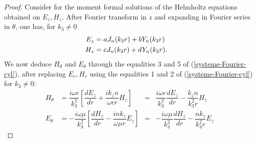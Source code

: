 \documentclass[12pt,%
    twoside,%
    a4paper,%
    openright, %
    ]{book}
\numberwithin{equation}{section} %
\renewcommand{\frac}[2]{\dfrac{#1}{#2}} %
\begin{document}
            \begin{proof}
                Consider for the moment formal solutions of the Helmholtz equations obtained on $E_z,H_z$.
                After Fourier transform in $z$ and expanding in Fourier series in $\theta$, one has, for $k_3\not=0$
                \begin{align*}
                    E_z&=aJ_n(k_3r)+bY_n(k_3r)\cr
                    H_z&=cJ_n(k_3r)+dY_n(k_3r).
                \end{align*}
                We now deduce $H_{\theta}$ and $E_{\theta}$ through the equalities 3 and 5 of (\ref{systeme-Fourier-cyl}), after replacing $E_r, H_r$ using the equalities 1 and 2 of (\ref{systeme-Fourier-cyl}) for $k_3\not=0$:
                \begin{align*}
                    H_{\theta}&=\frac{i\omega \epsilon}{k_3^2}[\frac{dE_z}{dr}+\frac{ik_zn}{\omega \epsilon r}H_z]&=& \frac{i\omega \epsilon}{k_3^2}\frac{dE_z}{dr}-\frac{k_zn}{k_3^2 r}H_z
                    \\
                    E_{\theta}&=-\frac{i\omega \mu}{k_3^2}[\frac{dH_z}{dr}-\frac{ink_z}{\omega \mu r}E_z]&=&-\frac{i\omega \mu}{k_3^2}\frac{dH_z}{dr}-\frac{nk_z}{k_3^2 r}E_z
                \end{align*}


\end{proof}
\end{document}
